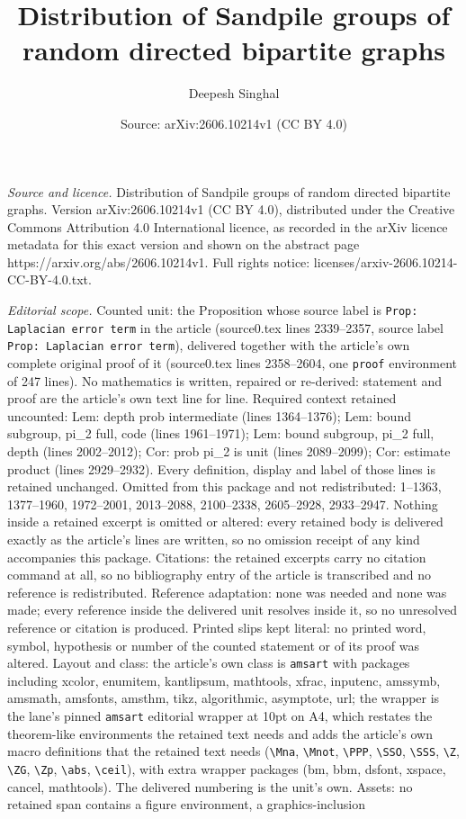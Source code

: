 \documentclass[10pt,a4paper]{amsart}
\title[Distribution of Sandpile groups of random directed bipartite]{Distribution of Sandpile groups of random directed bipartite graphs}
\author{Deepesh Singhal}
\date{Source: arXiv:2606.10214v1 (CC BY 4.0)}
\begin{document}
\maketitle

\noindent\emph{Source and licence.} Distribution of Sandpile groups of random directed bipartite graphs. Version arXiv:2606.10214v1 (CC BY 4.0), distributed under the Creative Commons Attribution 4.0 International licence, as recorded in the arXiv licence metadata for this exact version and shown on the abstract page https://arxiv.org/abs/2606.10214v1. Full rights notice: licenses/arxiv-2606.10214-CC-BY-4.0.txt.\par\smallskip

\noindent\textit{Editorial scope.} Counted unit: the Proposition whose source label is \texttt{Prop: Laplacian error term} in the article (source0.tex lines 2339--2357, source label \texttt{Prop: Laplacian error term}), delivered together with the article's own complete original proof of it (source0.tex lines 2358--2604, one \texttt{proof} environment of 247 lines). No mathematics is written, repaired or re-derived: statement and proof are the article's own text line for line. Required context retained uncounted: Lem: depth prob intermediate (lines 1364--1376); Lem: bound subgroup, pi\_2 full, code (lines 1961--1971); Lem: bound subgroup, pi\_2 full, depth (lines 2002--2012); Cor: prob pi\_2 is unit (lines 2089--2099); Cor: estimate product (lines 2929--2932). Every definition, display and label of those lines is retained unchanged. Omitted from this package and not redistributed: 1--1363, 1377--1960, 1972--2001, 2013--2088, 2100--2338, 2605--2928, 2933--2947. Nothing inside a retained excerpt is omitted or altered: every retained body is delivered exactly as the article's lines are written, so no omission receipt of any kind accompanies this package. Citations: the retained excerpts carry no citation command at all, so no bibliography entry of the article is transcribed and no reference is redistributed. Reference adaptation: none was needed and none was made; every reference inside the delivered unit resolves inside it, so no unresolved reference or citation is produced. Printed slips kept literal: no printed word, symbol, hypothesis or number of the counted statement or of its proof was altered. Layout and class: the article's own class is \texttt{amsart} with packages including xcolor, enumitem, kantlipsum, mathtools, xfrac, inputenc, amssymb, amsmath, amsfonts, amsthm, tikz, algorithmic, asymptote, url; the wrapper is the lane's pinned \texttt{amsart} editorial wrapper at 10pt on A4, which restates the theorem-like environments the retained text needs and adds the article's own macro definitions that the retained text needs (\texttt{\textbackslash Mna}, \texttt{\textbackslash Mnot}, \texttt{\textbackslash PPP}, \texttt{\textbackslash SSO}, \texttt{\textbackslash SSS}, \texttt{\textbackslash Z}, \texttt{\textbackslash ZG}, \texttt{\textbackslash Zp}, \texttt{\textbackslash abs}, \texttt{\textbackslash ceil}), with extra wrapper packages (bm, bbm, dsfont, xspace, cancel, mathtools). The delivered numbering is the unit's own. Assets: no retained span contains a figure environment, a graphics-inclusion 
\end{document}
